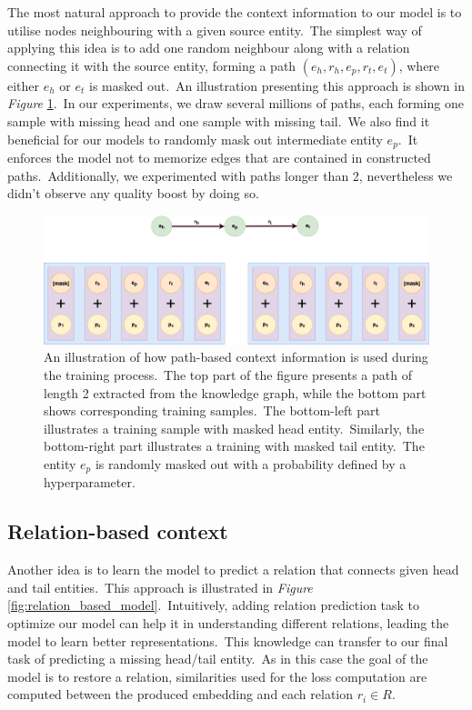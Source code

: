 \documentclass[longabstract, english, mgr]{iithesis}
\theoremstyle{default_theorem_style}\newtheorem{theorem}{Theorem}
\theoremstyle{default_theorem_style}\newtheorem{definition}{Definition}
\begin{document}
The most natural approach to provide the context information to our model is to utilise nodes neighbouring with a given
source entity.\ The simplest way of applying this idea is to add one random neighbour along with a relation connecting
it with the source entity, forming a path $(e_h, r_h, e_p, r_t, e_t)$, where either $e_h$ or $e_t$ is masked
out.\ An illustration presenting this approach is shown in \textit{Figure} \ref{fig:path_based_model}.\ In our
experiments, we draw several millions of paths, each forming one sample with missing head and one sample with missing
tail.\ We also find it beneficial for our models to randomly mask out intermediate entity $e_p$.\ It enforces the
model not to memorize edges that are contained in constructed paths.\ Additionally, we experimented with paths longer
than 2, nevertheless we didn't observe any quality boost by doing so.\newline

\begin{figure}[h!]
\centering
\includegraphics[scale=0.22]{path_based_model}
\caption{An illustration of how path-based context information is used during the training process.\ The top part
of the figure presents a path of length 2 extracted from the knowledge graph, while the bottom part shows corresponding
training samples.\ The bottom-left part illustrates a training sample with masked head entity.\ Similarly, the
bottom-right part illustrates a training with masked tail entity.\ The entity $e_p$ is randomly masked out with a
probability defined by a hyperparameter.}
\label{fig:path_based_model}
\end{figure}

\subsection{Relation-based context}

Another idea is to learn the model to predict a relation that connects given head and tail entities.\ This approach is
illustrated in \textit{Figure} \ref{fig:relation_based_model}.\ Intuitively, adding relation prediction task to
optimize our model can help it in understanding different relations, leading the model to learn better
representations.\ This knowledge can transfer to our final task of predicting a missing head/tail
entity.\ As in this case the goal of the model is to restore a relation, similarities used for the loss computation
are computed between the produced embedding and each relation $r_i \in R$.\newline
\end{document}
